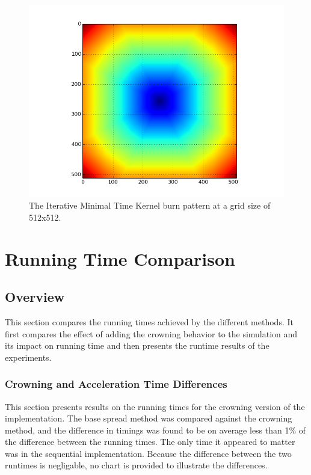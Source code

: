\begin{figure}%
\centering
  \includegraphics[height=0.27\textheight]{figures/results/it_min_time.png}
  \caption{The Iterative Minimal Time Kernel burn pattern at a grid size of 512x512.}
  \label{fig:it_min_time}
\end{figure}

\section{Running Time Comparison}
\subsection{Overview}
This section compares the running times achieved by the different methods. It first compares the effect of adding the crowning behavior to the simulation and its impact on running time and then presents the runtime results of the experiments.

\subsubsection{Crowning and Acceleration Time Differences}
This section presents results on the running times for the crowning version of the implementation. The base spread method was compared against the crowning method, and the difference in timings was found to be on average less than 1\% of the difference between the running times. The only time it appeared to matter was in the sequential implementation. Because the difference between the two runtimes is negligable, no chart is provided to illustrate the differences. 
 
